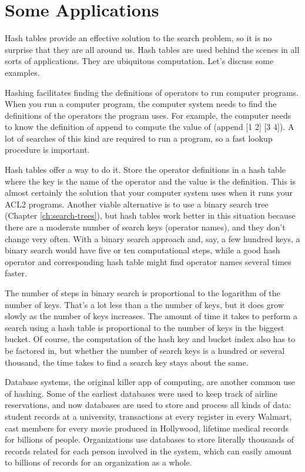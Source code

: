 \section{Some Applications}

Hash tables provide an effective solution to the search problem,
so it is no surprise that they are all around us.
Hash tables are used behind the scenes in all sorts of applications.
They are ubiquitous computation.
Let's discuss some examples.

Hashing facilitates finding the definitions of operators
to run computer programs.
When you run a computer program,
the computer system needs to find the definitions
of the operators the program uses.
For example, the computer needs to know the definition of
\textsf{append} to compute the value of \textsf{(append [1 2] [3  4])}.
A lot of searches of this kind are required to run a program,
so a fast lookup procedure is important.

Hash tables offer a way to do it. Store the operator
definitions in a hash table where the key is the name of the operator
and the value is the definition. This is almost certainly the solution
that your computer system uses when it runs your ACL2 programs.
Another viable alternative is to use a binary search tree
(Chapter \ref{ch:search-trees}), but hash tables work better
in this situation because there are a moderate number of search keys
(operator names), and they don't change very often.
With a binary search approach and, say, a few hundred keys,
a binary search would have five or ten computational steps,
while a good hash operator and corresponding hash table
might find operator names several times faster.

The number of steps in binary search is proportional to the
logarithm of the number of keys. That's a lot less than a the
number of keys, but it does grow slowly as the number of keys increases.
The amount of time it takes to perform a search using a hash table
is proportional to the number of keys in the biggest bucket.
Of course, the computation of the hash key and bucket index
also has to be factored in, but whether the number of search keys
is a hundred or several thousand, the time takes to find a search
key stays about the same.

Database systems, the original killer app of
computing, are another common use of hashing.
Some of the earliest databases were used to keep track
of airline reservations, and now databases are used to store and
process all kinds of data: student records at a university,
transactions at every register in every Walmart,
cast members for every movie produced in Hollywood,
lifetime medical records for billions of people.
Organizations use databases to store literally
thousands of records related for each person involved in the system,
which can easily amount to billions
of records for an organization as a whole.

